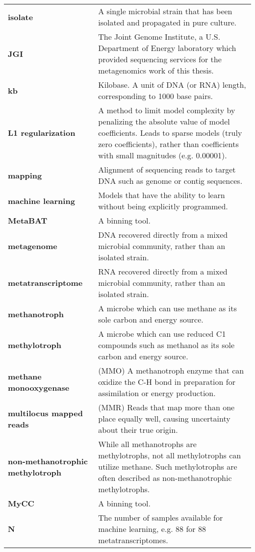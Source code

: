 \begin{singlespace}
\begin{longtable}{ p{}  p{} }
\textbf{isolate} & A single microbial strain that has been isolated and propagated in pure culture. \\
\textbf{JGI} & The Joint Genome Institute, a U.S. Department of Energy laboratory which provided sequencing
                services for the metagenomics work of this thesis. \\
\textbf{kb} & Kilobase. A unit of DNA (or RNA) length, corresponding to 1000 base pairs. \\
\textbf{L1 regularization} & A method to limit model complexity by penalizing the absolute value of model coefficients.
     Leads to sparse models (truly zero coefficients), rather than coefficients with small magnitudes (e.g. 0.00001). \\
\textbf{mapping} & Alignment of sequencing reads to target DNA such as genome or contig sequences.\\
\textbf{machine learning} & Models that have the ability to learn without being explicitly programmed. \\
\textbf{MetaBAT} &  A binning tool. \\
\textbf{metagenome} & DNA recovered directly from a mixed microbial community, rather than an isolated strain. \\
\textbf{metatranscriptome} & RNA recovered directly from a mixed microbial community, rather than an isolated strain. \\
\textbf{methanotroph} & A microbe which can use methane as its sole carbon and energy source. \\
\textbf{methylotroph} & A microbe which can use reduced C1 compounds such as methanol as its sole carbon and energy source. \\
\textbf{methane monooxygenase} & (MMO) A methanotroph enzyme that can oxidize the C-H bond in preparation for assimilation or energy production. \\
\textbf{multilocus mapped reads} & (MMR) Reads that map more than one place equally well, causing uncertainty about their true origin. \\
\textbf{non-methanotrophic methylotroph} & While all methanotrophs are methylotrophs, not all methylotrophs can utilize methane.
	Such methylotrophs are often described as non-methanotrophic methylotrophs. \\
\textbf{MyCC} & A binning tool. \\
\textbf{N} & The number of samples available for machine learning, e.g. 88 for 88 metatranscriptomes. \\

\end{longtable}
\end{singlespace}
